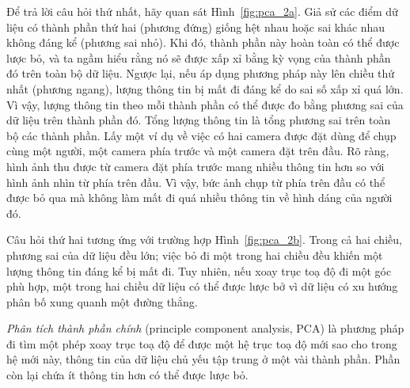 Để trả lời câu hỏi thứ nhất, hãy quan sát Hình~\ref{fig:pca_2a}. Giả sử các
điểm dữ liệu có thành phần thứ hai (phương đứng) giống hệt nhau hoặc sai khác
nhau không đáng kể (phương sai nhỏ). Khi đó, thành phần này hoàn toàn có thể được lược
bỏ, và ta ngầm hiểu rằng nó sẽ được xấp xỉ bằng kỳ vọng của thành phần đó
trên toàn bộ dữ liệu. Ngược lại, nếu áp dụng phương pháp này lên chiều thứ nhất (phương ngang), {lượng thông tin} bị mất đi đáng kể do sai số xấp xỉ quá lớn. Vì vậy, lượng thông tin theo mỗi thành phần có thể được đo bằng phương sai của dữ liệu trên thành phần đó. Tổng lượng
thông tin là tổng phương sai trên toàn bộ các thành phần. Lấy
một ví dụ về việc có hai camera được đặt dùng để chụp cùng một người, một camera
phía trước và một camera đặt trên đầu. Rõ ràng, hình ảnh thu được từ
camera đặt phía trước mang nhiều thông tin hơn so với hình ảnh nhìn từ
phía trên đầu. Vì vậy, bức ảnh chụp từ phía trên đầu có thể được bỏ qua mà không
làm mất đi quá nhiều thông tin về hình dáng của người đó.

Câu hỏi thứ hai tương ứng với trường hợp Hình~\ref{fig:pca_2b}. Trong cả hai
chiều, phương sai của dữ liệu đều lớn; việc bỏ đi một trong hai chiều đều khiến
một lượng thông tin đáng kể bị mất đi. Tuy nhiên, nếu xoay trục toạ độ đi một
góc phù hợp, một trong hai chiều dữ liệu có thể được lược bở vì dữ liệu có xu
hướng phân bố xung quanh một đường thẳng.
 
\textit{Phân tích thành phần chính} (principle component analysis, PCA) là
phương pháp đi tìm một phép xoay trục toạ độ để được một hệ trục toạ độ mới sao
cho trong hệ mới này, thông tin của dữ liệu chủ yếu tập trung ở một vài thành
phần. Phần còn lại chứa ít thông tin hơn có thể được lược bỏ.

